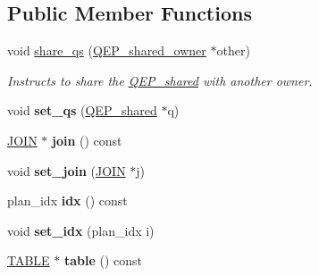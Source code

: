\subsection*{Public Member Functions}
\begin{DoxyCompactItemize}
\item 
\mbox{\label{classQEP__shared__owner_acc6c50774338af065e43dd90aecdb6a7}} 
void \mbox{\hyperlink{classQEP__shared__owner_acc6c50774338af065e43dd90aecdb6a7}{share\+\_\+qs}} (\mbox{\hyperlink{classQEP__shared__owner}{Q\+E\+P\+\_\+shared\+\_\+owner}} $\ast$other)
\begin{DoxyCompactList}\small\item\em Instructs to share the \mbox{\hyperlink{classQEP__shared}{Q\+E\+P\+\_\+shared}} with another owner. \end{DoxyCompactList}\item 
\mbox{\label{classQEP__shared__owner_a54bb3dae43718f82997935c0067cfd67}} 
void {\bfseries set\+\_\+qs} (\mbox{\hyperlink{classQEP__shared}{Q\+E\+P\+\_\+shared}} $\ast$q)
\item 
\mbox{\label{classQEP__shared__owner_a43d1b0de8e7765c2fded3dc3beef39c5}} 
\mbox{\hyperlink{classJOIN}{J\+O\+IN}} $\ast$ {\bfseries join} () const
\item 
\mbox{\label{classQEP__shared__owner_a9d0381464ceca63060684734a3d5692e}} 
void {\bfseries set\+\_\+join} (\mbox{\hyperlink{classJOIN}{J\+O\+IN}} $\ast$j)
\item 
\mbox{\label{classQEP__shared__owner_adcd88a5e6b55d46585ad45997994feb3}} 
plan\+\_\+idx {\bfseries idx} () const
\item 
\mbox{\label{classQEP__shared__owner_ae71fa1f8f63246b5074ddc1e85a6d175}} 
void {\bfseries set\+\_\+idx} (plan\+\_\+idx i)
\item 
\mbox{\label{classQEP__shared__owner_af67bfb58f85280f5d5e5eb97dc8604c5}} 
\mbox{\hyperlink{structTABLE}{T\+A\+B\+LE}} $\ast$ {\bfseries table} () const
\item 
\mbox{\label{classQEP__shared__owner_a9b91b1cdcd274bdfd254b60781343243}} 

\end{DoxyCompactItemize}

